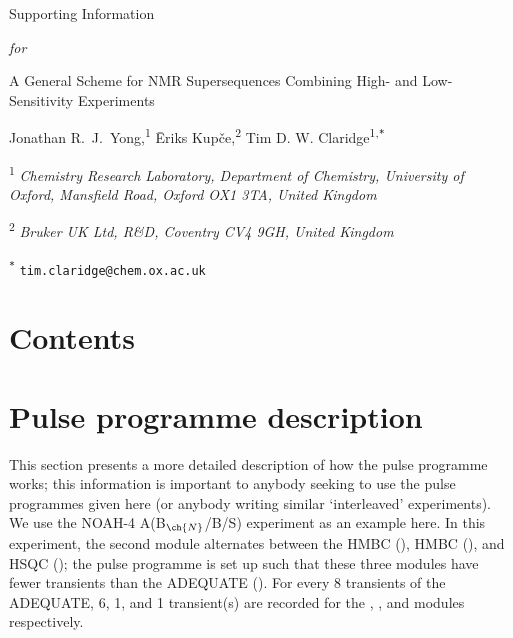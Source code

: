 \documentclass[a4paper,12pt]{article}
\newcommand{\me}{Jonathan R.\ J.\ Yong}
\newcommand{\eriks}{{\=E}riks Kup{\v{c}}e}
\newcommand{\tim}{Tim D. W. Claridge}
\newcommand{\articletitle}{A General Scheme for NMR Supersequences Combining High- and Low-Sensitivity Experiments}
\newcommand{\crl}{Chemistry Research Laboratory, Department of Chemistry, University of Oxford, Mansfield Road, Oxford OX1 3TA, United Kingdom}
\newcommand{\brukeruk}{Bruker UK Ltd, R\&D, Coventry CV4 9GH, United Kingdom}
\newcommand{\carbon}{\ch{^{13}C}}
\newcommand{\nitrogen}{\ch{^{15}N}}
\newcommand{\abnbs}{NOAH-4 A(B$_{\ch{N}}$/B/S)}
\begin{document}
\clearpage
\begin{refsection}
\newcommand{\sectionbreak}{\clearpage}
\renewcommand*{\thefigure}{S\arabic{figure}}
\renewcommand*{\thesection}{S\arabic{section}}
\renewcommand*{\thetable}{S\arabic{table}}
\renewcommand*{\thepage}{S\arabic{page}}
\setcounter{page}{1}
\setcounter{figure}{0}
\setcounter{section}{0}
\setcounter{table}{0}
\onehalfspacing

\hspace{0pt}
\vfill
\begin{center}
    \huge
    Supporting Information

    \vspace{0.3cm}

    \textit{for}

    \vspace{0.3cm}

    \articletitle{}

    \vspace{0.6cm}

    \Large \me{},\textsuperscript{1} \eriks{},\textsuperscript{2} \tim{}\textsuperscript{1,\texttt{*}}

    \vspace{0.6cm}

    \large \textsuperscript{1} \textit{\crl{}}

    \textsuperscript{2} \textit{\brukeruk{}}

    \textsuperscript{\texttt{*}} \texttt{tim.claridge@chem.ox.ac.uk}

\end{center}
\vfill

\newpage
\section*{Contents}

\startcontents[si]
\vfill
\hspace{0pt}
\newpage

\section{Pulse programme description}
\label{sec:pp_detail}

This section presents a more detailed description of how the pulse programme works; this information is important to anybody seeking to use the pulse programmes given here (or anybody writing similar `interleaved' experiments).
We use the \abnbs{} experiment as an example here.
In this experiment, the second module alternates between the \nitrogen{} HMBC (), \carbon{} HMBC (), and \carbon{} HSQC (); the pulse programme is set up such that these three modules have fewer transients than the ADEQUATE ().
For every 8 transients of the ADEQUATE, 6, 1, and 1 transient(s) are recorded for the , , and  modules respectively.


\end{refsection}
\end{document}

